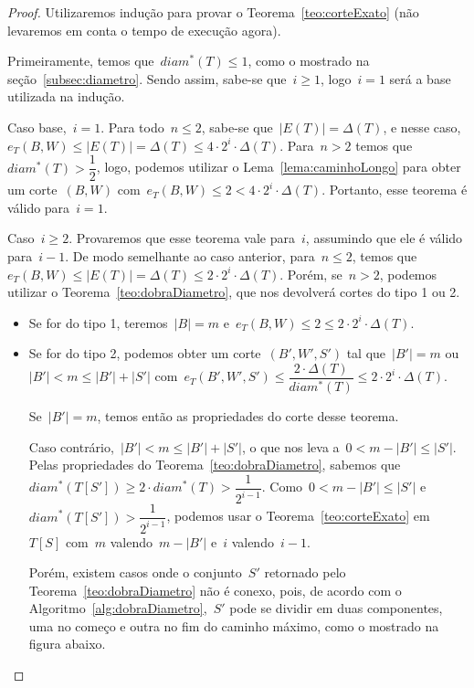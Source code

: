 \documentclass[a4paper,12pt]{article}
\begin{document}
	\begin{proof}
		Utilizaremos indução para provar o 
		Teorema~\ref{teo:corteExato} 
		(não levaremos em conta o tempo de execução agora).
		
		Primeiramente, temos que~${diam^*(T)\le1}$, como o mostrado 
		na seção~\ref{subsec:diametro}. 
		Sendo assim, sabe-se que~${i\ge1}$, logo~${i=1}$ será a base 
		utilizada na indução.
		
		Caso base,~${i=1}$.
		Para todo~${n\le 2}$, sabe-se que~${|E(T)|=\Delta(T)}$, e nesse
		caso,~${e_T(B,W)\le |E(T)|=\Delta(T)\le 4\cdot 2^i\cdot 
		\Delta(T)}$.
		Para~$n>2$ temos que~${diam^*(T)>\dfrac{1}{2}}$, logo, 
		podemos utilizar o Lema~\ref{lema:caminhoLongo} para obter 
		um corte~$(B,W)$ 
		com~${e_T(B,W)\le 2 < 4\cdot 2^i\cdot \Delta(T)}$.
		Portanto, esse teorema é válido para~${i=1}$.


		Caso~${i\ge 2}$. Provaremos que esse teorema vale para~$i$, 
		assumindo que ele é válido para~$i-1$.
		De modo semelhante ao caso anterior, para~${n\le2}$, temos 
		que~${e_T(B,W)\le |E(T)|=\Delta(T)\le 2\cdot 2^i\cdot 
		\Delta(T)}$.
		Porém, se~${n>2}$, podemos utilizar o 
		Teorema~\ref{teo:dobraDiametro}, que nos devolverá cortes 
		do tipo 1 ou 2.
		\begin{itemize}
			\item Se for do tipo 1, teremos~${|B|=m}$ 
			e~${e_T(B,W)\le2\le 2\cdot 2^i\cdot \Delta(T)}$.

			\item Se for do tipo 2, podemos obter um 
			corte~$(B',W',S')$
			tal que~${|B'|=m}$ ou~${|B'|<m\le |B'|+|S'|}$
			com~${e_T(B',W',S')\le \dfrac{2\cdot\Delta(T)}{diam^*(T)}\le
			2\cdot2^i\cdot\Delta(T)}$.
			
			Se~${|B'|=m}$, temos então as propriedades do corte desse
			teorema.

			Caso contrário,~${|B'|<m\le |B'|+|S'|}$, o que nos leva 
			a~${0<m-|B'|\le|S'|}$. 
			Pelas propriedades do Teorema~\ref{teo:dobraDiametro}, 
			sabemos que~${diam^*(T[S'])\ge 2\cdot diam^*(T)>
			\dfrac{1}{2^{i-1}}}$.
			Como~${0<m-|B'|\le|S'|}$ 
			e~${diam^*(T[S'])>\dfrac{1}{2^{i-1}}}$, podemos usar o 
			Teorema~\ref{teo:corteExato} em~$T[S]$ com~$m$ 
			valendo~${m-|B'|}$ e~$i$ valendo~${i-1}$.
			
			Porém, existem casos onde o conjunto~$S'$ retornado 
			pelo Teorema~\ref{teo:dobraDiametro} não é conexo, 
			pois, de acordo com o 
			Algoritmo~\ref{alg:dobraDiametro},~$S'$ pode se 
			dividir em duas componentes, uma no começo e outra
			no fim do caminho máximo, como o mostrado na figura 
			abaixo. 



\end{itemize}
\end{proof}
\end{document}
